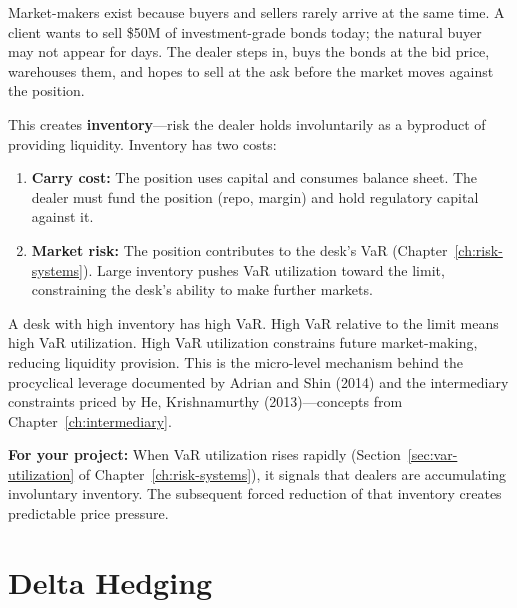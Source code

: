 Market-makers exist because buyers and sellers rarely arrive at the same
time.  A client wants to sell \$50M of investment-grade bonds today;
the natural buyer may not appear for days.  The dealer steps in, buys
the bonds at the bid price, warehouses them, and hopes to sell at the
ask before the market moves against the position.

This creates \textbf{inventory}---risk the dealer holds involuntarily
as a byproduct of providing liquidity.  Inventory has two costs:

\begin{enumerate}[nosep]
  \item \textbf{Carry cost:} The position uses capital and consumes
        balance sheet.  The dealer must fund the position (repo,
        margin) and hold regulatory capital against it.
  \item \textbf{Market risk:} The position contributes to the desk's
        VaR (Chapter~\ref{ch:risk-systems}).  Large inventory pushes
        VaR utilization toward the limit, constraining the desk's
        ability to make further markets.
\end{enumerate}

\begin{keyidea}
A desk with high inventory has high VaR.  High VaR relative to the
limit means high VaR utilization.  High VaR utilization constrains
future market-making, reducing liquidity provision.  This is the
micro-level mechanism behind the procyclical leverage documented by
Adrian and Shin (2014) and the intermediary constraints priced by
He, Krishnamurthy (2013)---concepts from Chapter~\ref{ch:intermediary}.

\textbf{For your project:} When VaR utilization rises rapidly
(Section~\ref{sec:var-utilization} of Chapter~\ref{ch:risk-systems}),
it signals that dealers are accumulating involuntary inventory.
The subsequent forced reduction of that inventory creates
predictable price pressure.
\end{keyidea}


\section{Delta Hedging}
\label{sec:delta-hedging}

